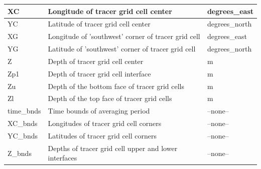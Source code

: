 \begin{longtable}{|m{}|m{}|m{}|}
XC &Longitude of tracer grid cell center &degrees\_east  \\ \hline
YC &Latitude of tracer grid cell center &degrees\_north  \\ \hline
XG &Longitude of 'southwest' corner of tracer grid cell &degrees\_east  \\ \hline
YG &Latitude of 'southwest' corner of tracer grid cell &degrees\_north  \\ \hline
Z &Depth of tracer grid cell center &m  \\ \hline
Zp1 &Depth of tracer grid cell interface &m  \\ \hline
Zu &Depth of the bottom face of tracer grid cells &m  \\ \hline
Zl &Depth of the top face of tracer grid cells &m  \\ \hline
time\_bnds &Time bounds of averaging period &--none--  \\ \hline
XC\_bnds &Longitudes of tracer grid cell corners &--none--  \\ \hline
YC\_bnds &Latitudes of tracer grid cell corners &--none--  \\ \hline
Z\_bnds &Depths of tracer grid cell upper and lower interfaces &--none--  \\ \hline
\end{longtable}

\newp
\pagebreak
